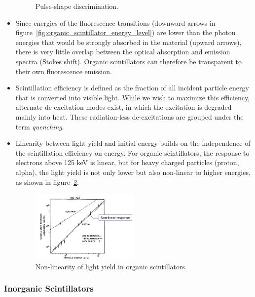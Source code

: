 \begin{itemize}
\begin{figure}[ht]
        \caption{Pulse-shape discrimination.}
        \label{fig:organic_scintillator_psd}
    \end{figure}
    \item Since energies of the fluorescence transitions (downward arrows in figure~\ref{fig:organic_scintillator_energy_level}) are lower than the photon energies that would be strongly absorbed in the material (upward arrows), there is very little overlap between the optical absorption and emission spectra (Stokes shift). Organic scintillators can therefore be transparent to their own fluorescence emission.
    \item Scintillation efficiency is defined as the fraction of all incident particle energy that is converted into visible light. While we wish to maximize this efficiency, alternate de-excitation modes exist, in which the excitation is degraded mainly into heat. These radiation-less de-excitations are grouped under the term \emph{quenching}.
    \item Linearity between light yield and initial energy builds on the independence of the scintillation efficiency on energy. For organic scintillators, the response to electrons above 125 keV is linear, but for heavy charged particles (proton, alpha), the light yield is not only lower but also non-linear to higher energies, as shown in figure~\ref{fig:organic_scintillator_proton_nonlinear}. 

    \begin{figure}[ht]
        \centering
        \includegraphics[width=0.5\textwidth]{images/organic_scintillator_proton_nonlinear.png}
        \caption{Non-linearity of light yield in organic scintillators.}
        \label{fig:organic_scintillator_proton_nonlinear}
    \end{figure}
\end{itemize}

\subsubsection{Inorganic Scintillators}



